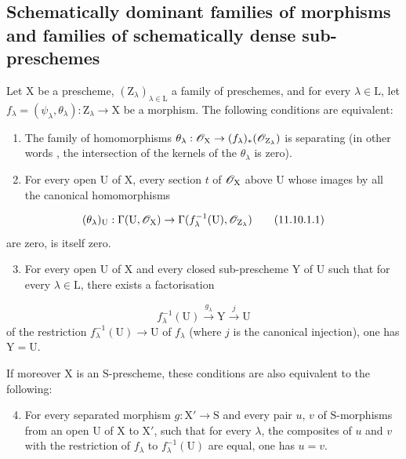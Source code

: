 \subsection{Schematically dominant families of morphisms and families of schematically dense sub\mbox{-}preschemes}
\label{subsection:IV.11.10}

\begin{proposition}[11.10.1]
\label{IV.11.10.1}
Let $\mathrm{X}$ be a prescheme, $(\mathrm{Z}_\lambda)_{\lambda\in\mathrm{L}}$ a family of preschemes, and for every $\lambda\in\mathrm{L}$, let $f_\lambda=(\psi_\lambda,\theta_\lambda):\mathrm{Z}_\lambda\to\mathrm{X}$ be a morphism.
The following conditions are equivalent:
\begin{enumerate}[label=\emph{\alph*)}]
  \item The family of homomorphisms $\theta_\lambda:\mathscr{O}_\mathrm{X}\to(f_\lambda)_*(\mathscr{O}_{\mathrm{Z}_\lambda})$ is separating \textup{(in other words , the intersection of the kernels of the $\theta_\lambda$ is} zero\textup{)}.
  \item For every open $\mathrm{U}$ of $\mathrm{X}$, every section $t$ of $\mathscr{O}_\mathrm{X}$ above $\mathrm{U}$ whose images by all the canonical homomorphisms
\end{enumerate}
\[
  (\theta_\lambda)_\mathrm{U}:\Gamma(\mathrm{U},\mathscr{O}_\mathrm{X})\to\Gamma(f_\lambda^{-1}(\mathrm{U}),\mathscr{O}_{\mathrm{Z}_\lambda})
\tag{11.10.1.1}\label{IV.11.10.1.1}
\]
are zero, is itself zero.
\begin{enumerate}[label=\emph{\alph*)}]
\setcounter{enumi}{2}
  \item For every open $\mathrm{U}$ of $\mathrm{X}$ and every closed sub-prescheme $\mathrm{Y}$ of $\mathrm{U}$ such that for every $\lambda\in\mathrm{L}$, there exists a factorisation
\end{enumerate}
\[
  f_\lambda^{-1}(\mathrm{U})\xrightarrow{g_\lambda}\mathrm{Y}\xrightarrow{j}\mathrm{U}
\tag{11.10.1.2}\label{IV.11.10.1.2}
\]
of the restriction $f_\lambda^{-1}(\mathrm{U})\to\mathrm{U}$ of $f_\lambda$ \textup{(where $j$ is the canonical injection)}, one has $\mathrm{Y}=\mathrm{U}$.

If moreover $\mathrm{X}$ is an $\mathrm{S}$-prescheme, these conditions are also equivalent to the following:
\begin{enumerate}[label=\emph{\alph*)}]
\setcounter{enumi}{3}
  \item For every separated morphism $g:\mathrm{X}'\to\mathrm{S}$ and every pair $u$, $v$ of $\mathrm{S}$-morphisms from an open $\mathrm{U}$ of $\mathrm{X}$ to $\mathrm{X}'$, such that for every $\lambda$, the composites of $u$ and $v$ with the restriction of $f_\lambda$ to $f_\lambda^{-1}(\mathrm{U})$ are equal, one has $u=v$.
\end{enumerate}
\end{proposition}

